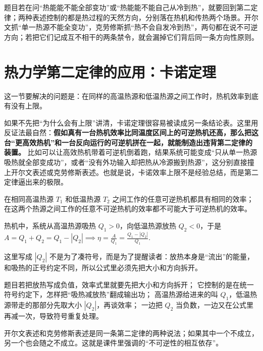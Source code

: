 \documentclass[lang=cn,11pt]{elegantbook}
\newcommand{\bridge}[1]{\begin{note}#1\end{note}}
\begin{document}
\begin{note}
 题目若在问“热能能不能全部变功”或“热能能不能自己从冷到热”，就要回到第二定律；两种表述控制的都是热过程的天然方向，分别落在热机和传热两个场景。开尔文抓“单一热源不能全变功”，克劳修斯抓“热不会自发冷到热”，两句都在说不可逆方向；若把它们记成互不相干的两条禁令，就会漏掉它们背后同一条方向性原则。
\end{note}

\section{热力学第二定律的应用：卡诺定理}

这一节要解决的问题是：在同样的高温热源和低温热源之间工作时，热机效率到底有没有上限。

如果不先把“为什么会有上限”讲清，卡诺定理很容易被读成另一条结论表。这里用反证法最自然：\textbf{假如真有一台热机效率比同温度区间上的可逆热机还高，那么把这台“更高效热机”和一台反向运行的可逆机拼在一起，就能制造出违背第二定律的装置。} 比如可以让高效热机带着可逆机倒着跑，结果系统可能变成“只从单一热源吸热就全部变成功”，或者“没有外功输入却把热从冷源搬到热源”，这分别直接撞上开尔文表述或克劳修斯表述。也就是说，卡诺效率上限不是经验总结，而是第二定律逼出来的极限。

\begin{theorem}[卡诺定理]
在相同高温热源 \(T_1\) 和低温热源 \(T_2\) 之间工作的任意可逆热机都具有相同的效率；在这两个热源之间工作的任意不可逆热机的效率都不可能大于可逆热机的效率。
\end{theorem}

热机中，系统从高温热源吸热 \(Q_1>0\)，向低温热源放热 \(Q_2<0\)，于是
 \(A=Q_1+Q_2=Q_1-|Q_2| \implies \eta=\frac{A}{Q_1}=\frac{Q_1-|Q_2|}{Q_1}.\) 

\bridge{这里写成 \(|Q_2|\) 不是为了凑符号，而是为了提醒读者：放热本身是“流出”的能量，和吸热的正号约定不同，所以公式里必须先把大小和方向拆开。}

\begin{note}
 题目若把放热写成负值，效率式里就要先把大小和方向拆开； 它控制的是在统一符号约定下，怎样把“吸热减放热”翻成输出功； 高温热源给进来的叫 \(Q_1\)，低温热源带走的那部分先取大小 \(|Q_2|\)，再谈效率； 一边把 \(Q_2\) 当负数，一边又在公式里再减一次，导致符号重复处理。
\end{note}

\begin{remark}
开尔文表述和克劳修斯表述是同一条第二定律的两种说法；如果其中一个不成立，另一个也会随之不成立。这就是课件里强调的“不可逆性的相互依存”。
\end{remark}
\end{document}
